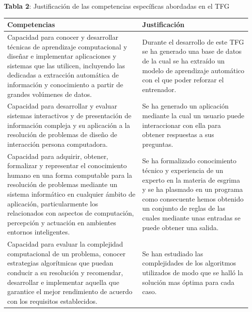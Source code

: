 \documentclass[11pt,a4paper,twoside,final]{article}
\begin{document}
\begin{center}
   \textbf{Tabla 2}: Justificación de las competencias específicas abordadas en el TFG\\[1em]
   \begin{tabular}{p{} p{}}
		\textbf{Competencias} & \textbf{Justificación} \\
		\hline
			Capacidad para conocer y desarrollar técnicas de aprendizaje computacional y diseñar e implementar aplicaciones y sistemas que las utilicen, incluyendo las dedicadas a extracción automática de información y conocimiento a partir de grandes volúmenes de datos. & Durante el desarrollo de este TFG se ha generado una base de datos de la cual se ha extraído un modelo de aprendizaje automático con el que poder reforzar el entrenador.\\

            Capacidad para desarrollar y evaluar sistemas interactivos y de presentación de información compleja y su aplicación a la resolución de problemas de diseño de interacción persona computadora. & Se ha generado un aplicación mediante la cual un usuario puede interaccionar con ella para obtener respuestas a sus preguntas.\\

            Capacidad para adquirir, obtener, formalizar y representar el conocimiento humano en una forma computable para la resolución de problemas mediante un sistema informático en cualquier ámbito de aplicación, particularmente los relacionados con aspectos de computación, percepción y actuación en ambientes entornos inteligentes. &  Se ha formalizado conocimiento técnico y experiencia de un experto en la materia de esgrima y se ha plasmado en un programa como consecuente hemos obtenido un conjunto de reglas de las cuales mediante unas entradas se puede obtener una salida.  \\

			Capacidad para evaluar la complejidad computacional de un problema, conocer estrategias algorítmicas que puedan conducir a su resolución y recomendar, desarrollar e implementar aquella que garantice el mejor rendimiento de acuerdo con los requisitos establecidos. & Se han estudiado las complejidades de los algoritmos utilizados de modo que se halló la solución mas óptima para cada caso. \\

		\hline
   \end{tabular}
\end{center}
\end{document}
